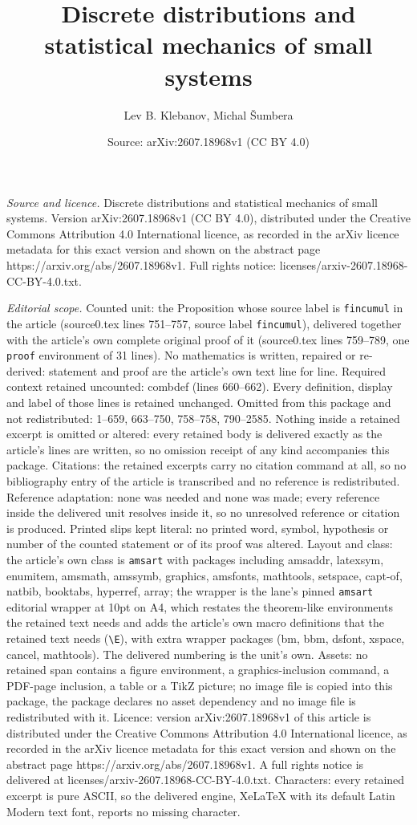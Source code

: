 \documentclass[10pt,a4paper]{amsart}
\title[Discrete distributions and statistical mechanics of small sy]{Discrete distributions and statistical mechanics of small systems}
\author{Lev B. Klebanov, Michal \v{S}umbera}
\date{Source: arXiv:2607.18968v1 (CC BY 4.0)}
\begin{document}
\maketitle

\noindent\emph{Source and licence.} Discrete distributions and statistical mechanics of small systems. Version arXiv:2607.18968v1 (CC BY 4.0), distributed under the Creative Commons Attribution 4.0 International licence, as recorded in the arXiv licence metadata for this exact version and shown on the abstract page https://arxiv.org/abs/2607.18968v1. Full rights notice: licenses/arxiv-2607.18968-CC-BY-4.0.txt.\par\smallskip

\noindent\textit{Editorial scope.} Counted unit: the Proposition whose source label is \texttt{fincumul} in the article (source0.tex lines 751--757, source label \texttt{fincumul}), delivered together with the article's own complete original proof of it (source0.tex lines 759--789, one \texttt{proof} environment of 31 lines). No mathematics is written, repaired or re-derived: statement and proof are the article's own text line for line. Required context retained uncounted: combdef (lines 660--662). Every definition, display and label of those lines is retained unchanged. Omitted from this package and not redistributed: 1--659, 663--750, 758--758, 790--2585. Nothing inside a retained excerpt is omitted or altered: every retained body is delivered exactly as the article's lines are written, so no omission receipt of any kind accompanies this package. Citations: the retained excerpts carry no citation command at all, so no bibliography entry of the article is transcribed and no reference is redistributed. Reference adaptation: none was needed and none was made; every reference inside the delivered unit resolves inside it, so no unresolved reference or citation is produced. Printed slips kept literal: no printed word, symbol, hypothesis or number of the counted statement or of its proof was altered. Layout and class: the article's own class is \texttt{amsart} with packages including amsaddr, latexsym, enumitem, amsmath, amssymb, graphics, amsfonts, mathtools, setspace, capt-of, natbib, booktabs, hyperref, array; the wrapper is the lane's pinned \texttt{amsart} editorial wrapper at 10pt on A4, which restates the theorem-like environments the retained text needs and adds the article's own macro definitions that the retained text needs (\texttt{\textbackslash E}), with extra wrapper packages (bm, bbm, dsfont, xspace, cancel, mathtools). The delivered numbering is the unit's own. Assets: no retained span contains a figure environment, a graphics-inclusion command, a PDF-page inclusion, a table or a TikZ picture; no image file is copied into this package, the package declares no asset dependency and no image file is redistributed with it. Licence: version arXiv:2607.18968v1 of this article is distributed under the Creative Commons Attribution 4.0 International licence, as recorded in the arXiv licence metadata for this exact version and shown on the abstract page https://arxiv.org/abs/2607.18968v1. A full rights notice is delivered at licenses/arxiv-2607.18968-CC-BY-4.0.txt. Characters: every retained excerpt is pure ASCII, so the delivered engine, XeLaTeX with its default Latin Modern text font, reports no missing character.
\end{document}
